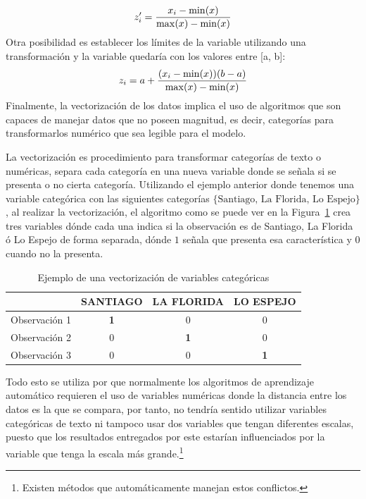 \begin{description}
  \begin{equation*}
  \centering
        z^{\prime}_{i}=\frac{x_i-\min(x)}{\max(x)-\min(x)}
  \end{equation*}
  Otra posibilidad es establecer los límites de la variable utilizando una transformación y la variable quedaría con los valores entre [a, b]:
  \begin{equation*}
  \centering
       z_i=a + \frac{(x_i-\min(x))(b - a)}{\max(x)-\min(x)}
  \end{equation*}
  Finalmente, la vectorización de los datos implica el uso de algoritmos que son capaces de manejar datos que no poseen magnitud, es decir, categorías para transformarlos numérico que sea legible para el modelo.
  
  La vectorización es procedimiento para transformar categorías de texto o numéricas, separa cada categoría en una nueva variable donde se señala si se presenta o no cierta categoría. Utilizando el ejemplo anterior donde tenemos una variable categórica con las siguientes categorías $\{\textrm{Santiago, La Florida, Lo Espejo}\}$, al realizar la vectorización, el algoritmo como se puede ver en la Figura~\ref{fig:vect} crea tres variables dónde cada una indica si la observación es de Santiago, La Florida ó Lo Espejo de forma separada, dónde $1$ señala que presenta esa característica y $0$ cuando no la presenta.
    \begin{table}[H]
    \centering
    \begin{tabular}{l|c|c|c|}
    \cline{2-4}
     & \multicolumn{1}{l|}{\textbf{SANTIAGO}} & \multicolumn{1}{l|}{\textbf{LA FLORIDA}} & \multicolumn{1}{l|}{\textbf{LO ESPEJO}} \\ \hline
    \multicolumn{1}{|l|}{Observación 1} & \textbf{1} & 0 & 0 \\ \hline
    \multicolumn{1}{|l|}{Observación 2} & 0 & \textbf{1} & 0 \\ \hline
    \multicolumn{1}{|l|}{Observación 3} & 0 & 0 & \textbf{1} \\ \hline
    \end{tabular}
    \caption{Ejemplo de una vectorización de variables categóricas}
    \label{fig:vect}
    \end{table}
      
  Todo esto se utiliza por que normalmente los algoritmos de aprendizaje automático requieren el uso de variables numéricas donde la distancia entre los datos es la que se compara, por tanto, no tendría sentido utilizar variables categóricas de texto ni tampoco usar dos variables que tengan diferentes escalas, puesto que los resultados entregados por este estarían influenciados por la variable que tenga la escala más grande.\footnote{Existen métodos que automáticamente manejan estos conflictos.}

\end{description}
